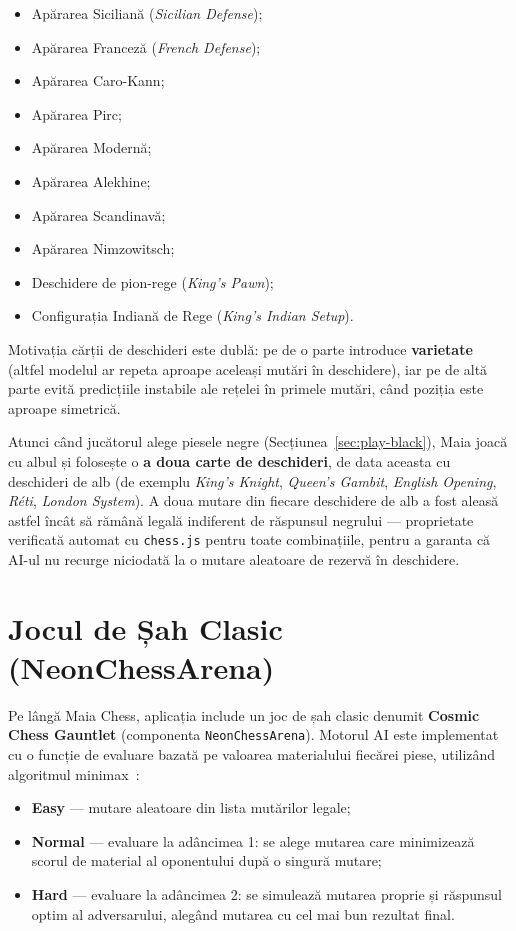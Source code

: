 \documentclass[12pt, a4paper, twoside]{report}
\numberwithin{equation}{section}
\begin{document}
\begin{itemize}
  \item Apărarea Siciliană (\textit{Sicilian Defense});
  \item Apărarea Franceză (\textit{French Defense});
  \item Apărarea Caro-Kann;
  \item Apărarea Pirc;
  \item Apărarea Modernă;
  \item Apărarea Alekhine;
  \item Apărarea Scandinavă;
  \item Apărarea Nimzowitsch;
  \item Deschidere de pion-rege (\textit{King's Pawn});
  \item Configurația Indiană de Rege (\textit{King's Indian Setup}).
\end{itemize}

Motivația cărții de deschideri este dublă: pe de o parte introduce \textbf{varietate}
(altfel modelul ar repeta aproape aceleași mutări în deschidere), iar pe de altă parte
evită predicțiile instabile ale rețelei în primele mutări, când poziția este aproape
simetrică.

Atunci când jucătorul alege piesele negre (Secțiunea~\ref{sec:play-black}), Maia joacă cu
albul și folosește o \textbf{a doua carte de deschideri}, de data aceasta cu deschideri de
alb (de exemplu \textit{King's Knight}, \textit{Queen's Gambit}, \textit{English Opening},
\textit{Réti}, \textit{London System}). A doua mutare din fiecare deschidere de alb a fost
aleasă astfel încât să rămână legală indiferent de răspunsul negrului — proprietate
verificată automat cu \texttt{chess.js} pentru toate combinațiile, pentru a garanta că AI-ul
nu recurge niciodată la o mutare aleatoare de rezervă în deschidere.

\section{Jocul de Șah Clasic (NeonChessArena)}

Pe lângă Maia Chess, aplicația include un joc de șah clasic denumit \textbf{Cosmic Chess
Gauntlet} (componenta \texttt{NeonChessArena}). Motorul AI este implementat cu o funcție
de evaluare bazată pe valoarea materialului fiecărei piese, utilizând algoritmul
minimax~\cite{minimax}:

\begin{itemize}
  \item \textbf{Easy} — mutare aleatoare din lista mutărilor legale;
  \item \textbf{Normal} — evaluare la adâncimea 1: se alege mutarea care minimizează
    scorul de material al oponentului după o singură mutare;
  \item \textbf{Hard} — evaluare la adâncimea 2: se simulează mutarea proprie și
    răspunsul optim al adversarului, alegând mutarea cu cel mai bun rezultat final.
\end{itemize}
\end{document}
